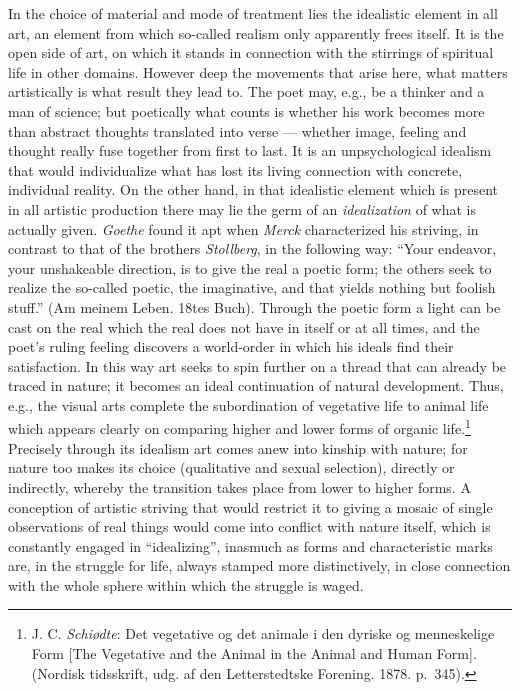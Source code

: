 \documentclass[12pt,a4paper]{book}
\newcommand{\opage}[1]{\marginnote{\footnotesize\textit{[#1]}}}
\begin{document}
In the choice of material and mode of treatment lies the idealistic
element in all art, an element from which so-called realism only
apparently frees itself. It is the open side of art, on which it stands
in connection with the stirrings of spiritual life in other domains.
However deep the movements that arise here, what matters artistically is
what result they lead to. The poet may, e.g., be a thinker and a man of
science; but poetically what counts is whether his work becomes more
than abstract thoughts translated into verse --- whether image, feeling
and thought really fuse together from first to last. It is
\opage{226}an unpsychological idealism that would individualize what has
lost its living connection with concrete, individual reality. On the
other hand, in that idealistic element which is present in all artistic
production there may lie the germ of an \emph{idealization} of what is
actually given. \emph{Goethe} found it apt when \emph{Merck}
characterized his striving, in contrast to that of the brothers
\emph{Stollberg}, in the following way: ``Your endeavor, your
unshakeable direction, is to give the real a poetic form; the others
seek to realize the so-called poetic, the imaginative, and that yields
nothing but foolish stuff.'' (Am meinem Leben. 18tes Buch).
Through the poetic form a light can be cast on the real which the real
does not have in itself or at all times, and the poet's ruling feeling
discovers a world-order in which his ideals find their satisfaction. In
this way art seeks to spin further on a thread that can already be
traced in nature; it becomes an ideal continuation of natural
development. Thus, e.g., the visual arts complete the subordination of
vegetative life to animal life which appears clearly on comparing higher
and lower forms of organic
life.\footnote{J. C. \emph{Schiødte}: Det vegetative og det animale i
den dyriske og menneskelige Form [The Vegetative and the Animal in the
Animal and Human Form]. (Nordisk tidsskrift, udg. af den
Letterstedtske Forening. 1878. p.~345).} Precisely through its idealism
art comes anew into kinship with nature; for nature too makes its
choice (qualitative and sexual selection), directly or indirectly,
whereby the transition takes place from lower to higher forms. A
conception of artistic striving that would restrict it to giving a
mosaic of single observations of real things would come into conflict
with nature itself, which is constantly engaged in ``idealizing'',
inasmuch as forms and characteristic marks are, in the struggle for
life, always stamped more distinctively, in close connection with the
whole sphere within which the struggle is waged.
\end{document}

